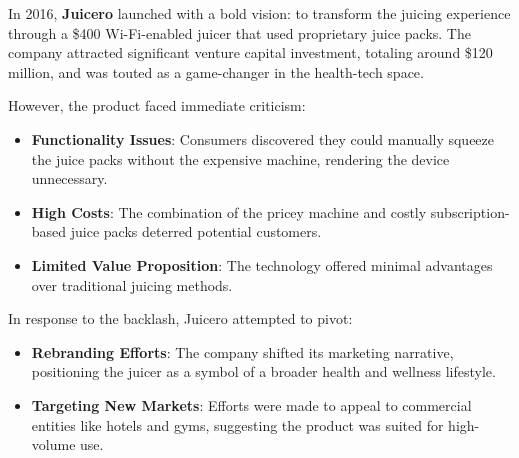 

\begin{tcolorbox}[colback=blue!5!white, colframe=blue!50!black,
  title={Historical Sidebar: Juicero — When Rebranding Couldn't Squeeze Out Success}]

In 2016, \textbf{Juicero} launched with a bold vision: to transform the juicing experience through a \$400 Wi-Fi-enabled juicer that used proprietary juice packs. The company attracted significant venture capital investment, totaling around \$120 million, and was touted as a game-changer in the health-tech space.

\medskip

However, the product faced immediate criticism:

\begin{itemize}
  \item \textbf{Functionality Issues}: Consumers discovered they could manually squeeze the juice packs without the expensive machine, rendering the device unnecessary.
  \item \textbf{High Costs}: The combination of the pricey machine and costly subscription-based juice packs deterred potential customers.
  \item \textbf{Limited Value Proposition}: The technology offered minimal advantages over traditional juicing methods.
\end{itemize}

\medskip

In response to the backlash, Juicero attempted to pivot:

\begin{itemize}
  \item \textbf{Rebranding Efforts}: The company shifted its marketing narrative, positioning the juicer as a symbol of a broader health and wellness lifestyle.
  \item \textbf{Targeting New Markets}: Efforts were made to appeal to commercial entities like hotels and gyms, suggesting the product was suited for high-volume use.
\end{itemize}


\end{tcolorbox}
